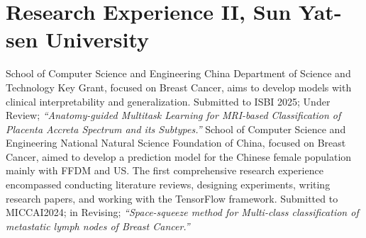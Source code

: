 \documentclass[11pt,a4paper, final]{moderncv}
\begin{document}
\section{\textbf{Research Experience II}, Sun Yat-sen University}
	{}{}{School of Computer Science and Engineering}
	{China Department of Science and Technology Key Grant, focused on Breast Cancer, 
	aims to develop models with clinical interpretability and generalization.}
	{Submitted to ISBI 2025; Under Review; 
	\emph{“Anatomy-guided Multitask Learning for MRI-based Classification of Placenta Accreta Spectrum and its Subtypes.”}}
	{}{}{School of Computer Science and Engineering}
	{National Natural Science Foundation of China, focused on Breast Cancer, 
	aimed to develop a prediction model for the Chinese female population mainly with FFDM and US.}
	{The first comprehensive research experience encompassed conducting literature reviews, designing experiments, 
	writing research papers, and working with the TensorFlow framework.}
	{Submitted to MICCAI2024; in Revising; 
	\emph{“Space-squeeze method for Multi-class classification of metastatic lymph nodes of Breast Cancer.”}}
\end{document}
